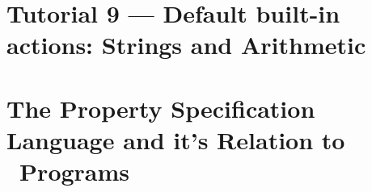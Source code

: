 \section{Tutorial 9 --- Default built-in actions: Strings and Arithmetic}

{
  \let\section\subsection
  \let\subsection\subsubsection
  \let\subsubsection\paragraph
  
  
  }

\section{The Property Specification Language and it's Relation to \gwendolen\ Programs}

{
  \let\section\subsection
  \let\subsection\subsubsection
  \let\subsubsection\paragraph
  
  
  }
